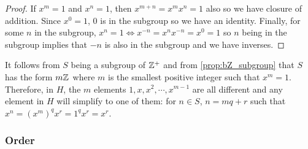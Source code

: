 \documentclass[MathsNotesBase.tex]{subfiles}
\begin{document}
{		
		\begin{proof}
			If $x^m = 1$ and $x^n = 1$, then $x^{m+n} = x^mx^n = 1$ also so we have closure of addition. Since $x^0 = 1$, 0 is in the subgroup so we have an identity. Finally, for some $n$ in the subgroup, $x^n = 1 \iff x^{-n} = x^nx^{-n} = x^0 = 1$ so $n$ being in the subgroup implies that $-n$ is also in the subgroup and we have inverses.
		\end{proof}
		\begin{corollary}
			It follows from $S$ being a subgroup of $\mathbb{Z}^{+}$ and from \autoref{prop:bZ_subgroup} that $S$ has the form $m\mathbb{Z}^{}$ where $m$ is the smallest positive integer such that $x^m = 1$. Therefore, in $H$, the $m$ elements $1, x, x^2, \cdots , x^{m-1}$ are all different and any element in $H$ will simplify to one of them: for $n \in S$, $n = mq + r$ such that $x^n = (x^m)^qx^r = 1^qx^r = x^r$.
		\end{corollary}
	
		
		\bigskip
		\subsubsection{Order}
		
	
}
\end{document}
